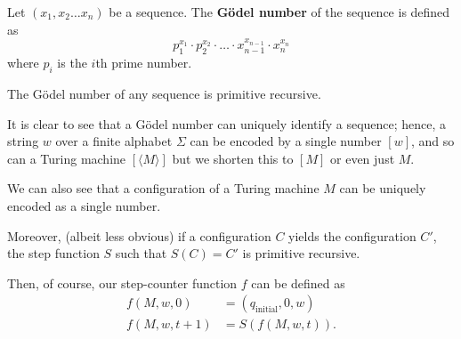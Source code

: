 \begin{definition}
    Let $(x_1, x_2 \ldots x_n)$ be a sequence. The \textbf{G\"odel number} of the sequence is defined as
    \[ p_1^{x_1} \cdot p_2^{x_2} \cdot \ldots \cdot x_{n - 1}^{x_{n - 1}} \cdot x_n^{x_n} \]
    where $p_i$ is the $i$th prime number.
\end{definition}

\begin{proposition}[]
    The G\"odel number of any sequence is primitive recursive.
\end{proposition}

It is clear to see that a G\"odel number can uniquely identify a sequence; hence, a string $w$ over a finite alphabet $\Sigma$ can be encoded by a single number $[w]$, and so can a Turing machine $[\langle M \rangle]$ but we shorten this to $[M]$ or even just $M$. 

We can also see that a configuration of a Turing machine $M$ can be uniquely encoded as a single number. 

Moreover, (albeit less obvious) if a configuration $C$ yields the configuration $C'$, the step function $S$ such that $S(C) = C'$ is primitive recursive.  %

Then, of course, our step-counter function $f$ can be defined as
\begin{align*}
    f(M, w, 0)     &= (q_\text{initial}, 0, w) \\
    f(M, w, t + 1) &= S(f(M, w, t)).
\end{align*}

